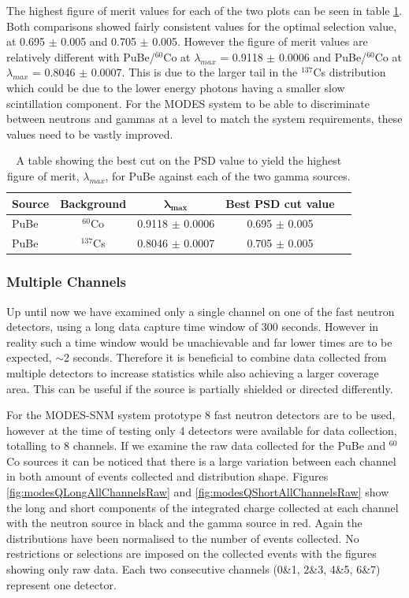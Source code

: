 The highest figure of merit values for each of the two plots can be seen in table \ref{tab:modesPSDBestCuts}. Both comparisons showed fairly consistent values for the optimal selection value, at 0.695 $\pm$ 0.005 and 0.705 $\pm$ 0.005. However the figure of merit values are relatively different with PuBe/$^{60}$Co at $\lambda_{max}$ = 0.9118 $\pm$ 0.0006 and PuBe/$^{60}$Co at $\lambda_{max}$ = 0.8046 $\pm$ 0.0007. This is due to the larger tail in the $^{137}$Cs distribution which could be due to the lower energy photons having a smaller slow scintillation component. For the MODES system to be able to discriminate between neutrons and gammas at a level to match the system requirements, these values need to be vastly improved.
\begin{table}[h]
\centering
	\begin{tabular}{lcccc}
	\hline
	\textbf{Source} & \textbf{Background} &{$\mathbf{\lambda_{max}}$} & \textbf{Best PSD cut value} \\
	\hline
	PuBe & $^{60}$Co & 0.9118 $\pm$ 0.0006 & 0.695 $\pm$ 0.005\\ 
	PuBe & $^{137}$Cs& 0.8046 $\pm$ 0.0007 & 0.705 $\pm$ 0.005\\ 
	\hline
\end{tabular}
\caption{A table showing the best cut on the PSD value to yield the highest figure of merit, $\lambda_{max}$, for PuBe against each of the two gamma sources. }
\label{tab:modesPSDBestCuts}
\end{table}

\subsubsection{Multiple Channels}
Up until now we have examined only a single channel on one of the fast neutron detectors, using a long data capture time window of 300 seconds. However in reality such a time window would be unachievable and far lower times are to be expected, $\sim$2 seconds. Therefore it is beneficial to combine data collected from multiple detectors to increase statistics while also achieving a larger coverage area. This can be useful if the source is partially shielded or directed differently. 

For the MODES-SNM system prototype 8 fast neutron detectors are to be used, however at the time of testing only 4 detectors were available for data collection, totalling to 8 channels. If we examine the raw data collected for the PuBe and $^{60}$Co sources it can be noticed that there is a large variation between each channel in both amount of events collected and distribution shape. Figures \ref{fig:modesQLongAllChannelsRaw} and \ref{fig:modesQShortAllChannelsRaw} show the long and short components of the integrated charge collected at each channel with the neutron source in black and the gamma source in red. Again the distributions have been normalised to the number of events collected. No restrictions or selections are imposed on the collected events with the figures showing only raw data. Each two consecutive channels (0\&1, 2\&3, 4\&5,  6\&7) represent one detector. 

